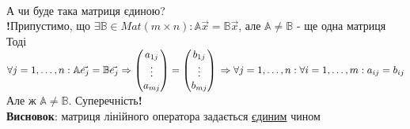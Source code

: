 \documentclass[a4paper, 14pt]{extarticle}
\begin{document}
	\\
	А чи буде така матриця єдиною?\\
	\textbf{!}Припустимо, що $\exists \mathbb{B} \in Mat(m \times n): \mathbb{A} \vec{x} = \mathbb{B} \vec{x}$, але $\mathbb{A} \neq \mathbb{B}$ - ще одна матриця\\
	Тоді $\forall j =1,\dots,n: \mathbb{A} \vec{e_j} = \mathbb{B} \vec{e_j} \Rightarrow \begin{pmatrix} a_{1j} \\ \vdots \\ a_{mj} \end{pmatrix} = \begin{pmatrix} b_{1j} \\ \vdots \\ b_{mj} \end{pmatrix} \\ \Rightarrow \forall j=1,\dots,n: \forall i = 1,\dots,m: a_{ij} = b_{ij}$\\
	Але ж $\mathbb{A} \neq \mathbb{B}$. Суперечність\textbf{!} \\
	\textbf{Висновок}: матриця лінійного оператора задається \underline{єдиним} чином\\
	
\end{document}
